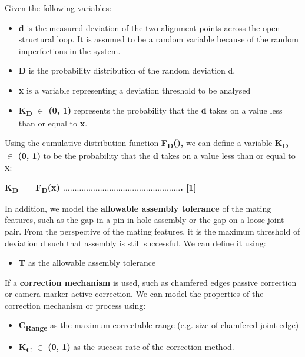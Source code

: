 Given the following variables: 

\begin{itemize}
	\item \textbf{d }is the measured deviation of the two alignment points across the open structural loop. It is assumed to be a random variable because of the random imperfections in the system. 

	\item \textbf{D} is the probability distribution of the random deviation d, 

	\item \textbf{x} is a variable representing a deviation threshold to be analysed 

	\item \textbf{K\textsubscript{D }$\in$ (0, 1) }represents the probability that the \textbf{d} takes on a value less than or equal to \textbf{x}. 

\end{itemize}
Using the cumulative distribution function \textbf{F\textsubscript{D}(),} we can define a variable \textbf{K\textsubscript{D }$\in$ (0, 1) }to be the probability that the \textbf{d} takes on a value less than or equal to \textbf{x}: 

\textbf{K\textsubscript{D} $=$ F\textsubscript{D}(x) $\ldots$$\ldots$$\ldots$$\ldots$$\ldots$$\ldots$$\ldots$$\ldots$$\ldots$$\ldots$$\ldots$$\ldots$$\ldots$$\ldots$$\ldots$$\ldots$$\ldots$. [1]}

In addition, we model the \textbf{allowable assembly tolerance} of the mating features, such as the gap in a pin-in-hole assembly or the gap on a loose joint pair. From the perspective of the mating features, it is the maximum threshold of deviation d such that assembly is still successful. We can define it using: 

\begin{itemize}
	\item \textbf{T }as the allowable assembly tolerance 
\end{itemize}

If a \textbf{correction mechanism} is used, such as chamfered edges passive correction or camera-marker active correction. We can model the properties of the correction mechanism or process using: 

\begin{itemize}
	\item \textbf{C\textsubscript{Range}} as the maximum correctable range (e.g. size of chamfered joint edge)

	\item \textbf{K\textsubscript{C}} \textbf{$\in$ (0, 1) }as the success rate of the correction method. 

\end{itemize}

